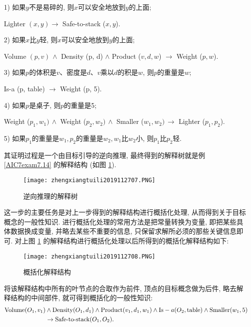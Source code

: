 1) 如果$y$不是易碎的, 则$x$可以安全地放到$y$的上面;
\begin{center}
    Lighter $(x, y) \rightarrow$ Safe-to-stack ($x, y$).
\end{center}

2) 如果$x$比$y$轻, 则$x$可以安全地放到$y$的上面;
\begin{center}
    Volume $(p, v)\, \wedge$ Density (p, d) $\wedge$ Product ($v, d, w$) $\rightarrow$ Weight ($p, w$).
\end{center}

3) 如果$p$的体积是$v$、密度是$d$、$v$乘以$d$的积是$w$, 则$p$的重量是$w$;
\begin{center}
    Is-a (p, table) $\rightarrow$ Weight (p, 5).
\end{center}

4) 如果$p$是桌子, 则$p$的重量是5;
\begin{center}
    Weight ($p_1, w_1)\, \wedge$ Weight ($p_2,w_2)\, \wedge$ Smaller ($w_1, w_2) \,\rightarrow$ Lighter ($p_1, p_2$).
\end{center}

5) 如果$p_1$的重量是$w_1, p_2$的重量是$w_2,w_1$比$w_2$小,  则$p_1$比$p_2$轻.

其证明过程是一个由目标引导的逆向推理, 最终得到的解释树就是例  \ref{AIC7exam7.14} 的解释结构 (如图 \ref{AI32fig2707}).
\begin{figure}[H]
\centering
\texttt{[image: zhengxiangtuili2019112707.PNG]}
\caption{逆向推理的解释树}
\label{AI32fig2707}
\vspace{-0.3cm}
\end{figure}

这一步的主要任务是对上一步得到的解释结构进行概括化处理, 从而得到关于目标概念的一般性知识.
     进行概括化处理的常用方法是把常量转换为变量, 即把某些具体数据换成变量, 并略去某些不重要的信息, 只保留求解所必须的那些关键信息即可.
     对上图 \ref{AI32fig2707} 的解释结构进行概括化处理以后所得到的概括化解释结构如下:
\begin{figure}[H]
    \centering
    \texttt{[image: zhengxiangtuili2019112708.PNG]}
    \caption{概括化解释结构}
    \label{AI32fig2708}
    \vspace{-0.3cm}
\end{figure}
 将该解释结构中所有的叶节点的合取作为前件, 顶点的目标概念做为后件, 略去解释结构的中间部件, 就可得到概括化的一般性知识:
\begin{align}
  \textup{Volume} (O_1,v_1)&\wedge \textup{Density} (O_1,d_1)\wedge \textup{Product} (v_1,d_1,w_1)\wedge \textup{Is}-a (O_2,\textup{table})\wedge\textup{Smaller} (w_1,5)\notag\\
                          &\rightarrow \textup{Safe-to-stack} (O_1,O_2).
\end{align}
